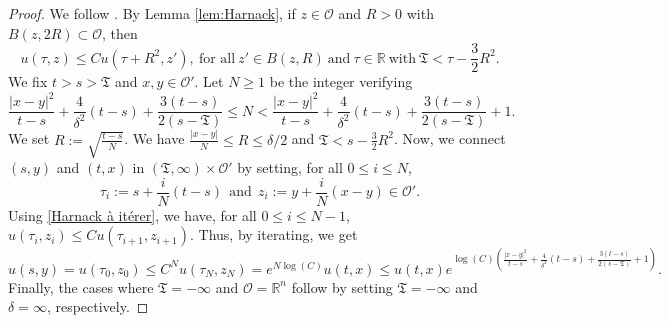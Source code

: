 \documentclass[12pt, letterpaper]{amsart}
\theoremstyle{definition}
\theoremstyle{remark}
\numberwithin{equation}{section}
\begin{document}
\begin{proof}
    We follow \cite[Theorem 5]{aronson1967local}. By Lemma \ref{lem:Harnack}, if $z \in \mathcal{O}$ and $R>0$ with $B(z,2R) \subset \mathcal{O}$, then 
    \begin{equation}\label{Harnack à itérer}
        u(\tau,z) \leq C u(\tau+R^2,z'), \ \text{for all} \ z' \in B(z,R) \ \text{and} \ \tau \in \mathbb{R} \ \text{with} \ \mathfrak{T}<\tau-\frac{3}{2}R^2. 
    \end{equation}
    We fix $t>s>\mathfrak{T}$ and $x, y \in \mathcal{O'}$. Let $N\ge1$ be the integer verifying 
    $$\frac{\left | x-y\right |^2}{t-s}+\frac{4}{\delta^2}(t-s)+\frac{3(t-s)}{2(s-\mathfrak{T})}\le N <  \frac{\left | x-y\right |^2}{t-s}+\frac{4}{\delta^2}(t-s)+\frac{3(t-s)}{2(s-\mathfrak{T})}+1.$$
    We set $R:= \sqrt{\frac{t-s}{N}}$. We have $\frac{\left | x-y\right |}{N}  \le R \le \delta/2$ and $ \mathfrak{T}<s-\frac{3}{2}R^2 $. Now, we connect $(s,y)$ and $(t,x)$ in $(\mathfrak{T},\infty)\times \mathcal{O'}$ by setting, for all $0 \le i \le N$,
    $$ \tau_i:= s+ \frac{i}{N}(t-s) \ \ \text{and} \ \ z_i:= y+\frac{i}{N}(x-y) \in \mathcal{O'} .$$
    Using \eqref{Harnack à itérer}, we have, for all $0 \le i \le N-1$, $u(\tau_i,z_i) \leq C u(\tau_{i+1},z_{i+1})$. Thus, by iterating, we get 
    $$ u(s,y)=u(\tau_0,z_0) \leq C^{N} u(\tau_N,z_N) = e^{N \log(C)} u(t,x) \leq u(t,x) e^{\log(C)\left ( \frac{\left | x-y\right |^2}{t-s}+\frac{4}{\delta^2}(t-s)+\frac{3(t-s)}{2(s-\mathfrak{T})}+1 \right )}. $$
    Finally, the cases where \(\mathfrak{T} = -\infty\) and \(\mathcal{O} = \mathbb{R}^n\) follow by setting \(\mathfrak{T} = -\infty\) and \(\delta = \infty\), respectively.
\end{proof}
\end{document}
